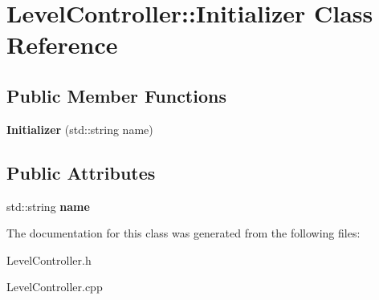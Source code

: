 \hypertarget{class_level_controller_1_1_initializer}{\section{Level\+Controller\+:\+:Initializer Class Reference}
\label{class_level_controller_1_1_initializer}
}
\subsection*{Public Member Functions}
\begin{DoxyCompactItemize}
\item 
\hypertarget{class_level_controller_1_1_initializer_a12f38f31c04a35ea21f977883eb6f4d5}{{\bfseries Initializer} (std\+::string name)}\label{class_level_controller_1_1_initializer_a12f38f31c04a35ea21f977883eb6f4d5}

\end{DoxyCompactItemize}
\subsection*{Public Attributes}
\begin{DoxyCompactItemize}
\item 
\hypertarget{class_level_controller_1_1_initializer_ac90a27c67674791807041b13124426c7}{std\+::string {\bfseries name}}\label{class_level_controller_1_1_initializer_ac90a27c67674791807041b13124426c7}

\end{DoxyCompactItemize}


The documentation for this class was generated from the following files\+:\begin{DoxyCompactItemize}
\item 
Level\+Controller.\+h\item 
Level\+Controller.\+cpp\end{DoxyCompactItemize}
